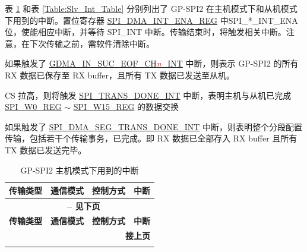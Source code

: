 \documentclass[main\_\_CN.tex]{subfiles}
\begin{document}
表  \ref{Table:Mst_Int_Table} 和表 \ref{Table:Slv_Int_Table} 分别列出了 GP-SPI2 在主机模式下和从机模式下用到的中断。置位寄存器 \hyperref[regdesc:SPIDMAINTENAREG]{SPI\_DMA\_INT\_ENA\_REG} 中SPI\_*\_INT\_ENA 位，使能相应中断，并等待 SPI\_INT 中断。传输结束时，将触发相关中断。注意，在下次传输之前，需软件清除中断。
\clearpage
\begin{ThreePartTable}

\begin{TableNotes}
    \item[1] 如果触发了 \hyperref[int:GDMAINSUCEOFINT]{GDMA\_IN\_SUC\_EOF\_CH\textcolor{red}{\it{n}}\_INT}  中断，则表示 GP-SPI2 的所有 RX 数据已保存至 RX buffer，且所有 TX 数据已发送至从机。
    \item[2] CS 拉高，则将触发 \hyperref[int:SPITRANSDONEINT]{SPI\_TRANS\_DONE\_INT} 中断，表明主机与从机已完成 \hyperref[regdesc:SPIW0REG]{SPI\_W0\_REG} $\sim$ \hyperref[regdesc:SPIW15REG]{SPI\_W15\_REG} 的数据交换
    \item[3] 如果触发了 \hyperref[int:SPIDMASEGTRANSDONEINT]{SPI\_DMA\_SEG\_TRANS\_DONE\_INT} 中断，则表明整个分段配置传输，包括若干个传输事务，已完成。即 RX 数据已全部存入 RX buffer 且所有 TX 数据已发送完毕。
\end{TableNotes}
\begin{longtable}[c]{|c|l|l|l|}
\caption{GP-SPI2 主机模式下用到的中断}
\label{Table:Mst_Int_Table}\\
\hline
\rowcolor{lightgray}
\textbf{传输类型 } & \textbf{ 通信模式} & \textbf{ 控制方式} & \textbf{ 中断 } \\\hline
    \endfirsthead
    \multicolumn{4}{c}{\bfseries \tablename\ \thetable{} -- 见下页}\\\hline
    \rowcolor{lightgray}
    \textbf{传输类型 } & \textbf{ 通信模式} & \textbf{ 控制方式} & \textbf{ 中断 }\\\hline
    \endhead

    \multicolumn{4}{r}{\textbf{接上页}} \\
    \endfoot


\end{longtable}
\end{ThreePartTable}
\end{document}
